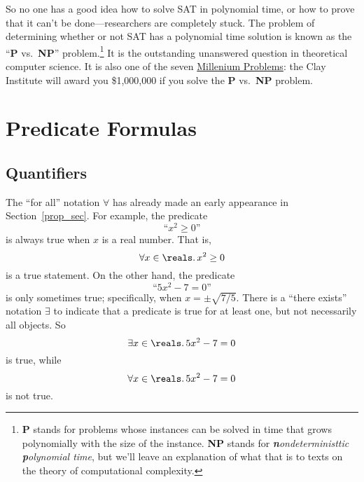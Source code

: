 So no one has a good idea how to solve SAT in polynomial time, or how
to prove that it can't be done---researchers are completely stuck.
The problem of determining whether or not SAT has a polynomial time
solution is known as the ``\textbf{P} vs.\ \textbf{NP}''
problem.\footnote{\textbf{P} stands for problems whose instances can
  be solved in time that grows polynomially with the size of the
  instance.  \textbf{NP} stands for \emph{\textbf{n}ondeterministtic \textbf{p}olynomial time},
  but we'll leave an explanation of what that is to texts on the
  theory of computational complexity.}  It is the outstanding
unanswered question in theoretical computer science.  It is also one
of the seven \href{http://www.claymath.org/millennium/}{Millenium
  Problems}: the Clay Institute will award you \$1,000,000 if you
solve the \textbf{P} vs.\ \textbf{NP} problem.

\begin{problems}


\homeworkproblems
{}

\end{problems}

\section{Predicate Formulas}\label{predicate_sec}

\subsection{Quantifiers}\label{quantifier_sec}
The ``for all'' notation $\forall$ has already made an early
appearance in Section~\ref{prop_sec}.  For example, the predicate
\[
\text{``$x^2 \geq 0$''}
\]
is always true when $x$ is a real number.  That is,
\[
\forall x \in \reals.\, x^2 \geq 0
\]
is a true statement.  On the other hand, the predicate
\[
\text{``$5x^2 - 7 = 0$''}
\]
is only sometimes true; specifically, when $x = \pm \sqrt{7/5}$.
There is a ``there exists'' notation $\exists$ to indicate that a
predicate is true for at least one, but not necessarily all objects.
So 
\[
\exists x \in \reals.\, 5x^2 - 7 = 0
\]
is true, while
\[
\forall x \in \reals.\, 5x^2 - 7 = 0
\]
is not true.

